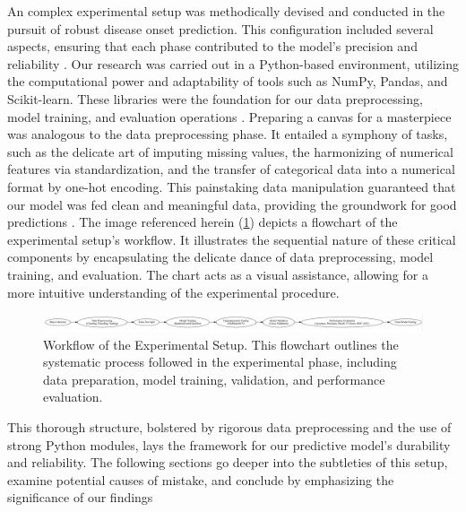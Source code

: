 \documentclass[manuscript,screen,]{acmart}
\begin{document}
An complex experimental setup was methodically devised and conducted in the pursuit of robust disease onset prediction. This configuration included several aspects, ensuring that each phase contributed to the model's precision and reliability \cite{Sturzenegger2012SemiAutomatedMM}.
Our research was carried out in a Python-based environment, utilizing the computational power and adaptability of tools such as NumPy, Pandas, and Scikit-learn. These libraries were the foundation for our data preprocessing, model training, and evaluation operations \cite{Castro2023LandscapeHP}.
Preparing a canvas for a masterpiece was analogous to the data preprocessing phase. It entailed a symphony of tasks, such as the delicate art of imputing missing values, the harmonizing of numerical features via standardization, and the transfer of categorical data into a numerical format by one-hot encoding. This painstaking data manipulation guaranteed that our model was fed clean and meaningful data, providing the groundwork for good predictions \cite{Alexandropoulos2019DataPreprocessing}.
The image referenced herein (\ref{fig: Experimental Setup Workflow}) depicts a flowchart of the experimental setup's workflow. It illustrates the sequential nature of these critical components by encapsulating the delicate dance of data preprocessing, model training, and evaluation. The chart acts as a visual assistance, allowing for a more intuitive understanding of the experimental procedure.

\begin{figure}
    \centering
    \includegraphics[width=1\linewidth]{Images//Sections/Experimental Setup Workflow.png}
    \caption{Workflow of the Experimental Setup. This flowchart outlines the systematic process followed in the experimental phase, including data preparation, model training, validation, and performance evaluation.}
    \label{fig: Experimental Setup Workflow}
\end{figure}

This thorough structure, bolstered by rigorous data preprocessing and the use of strong Python modules, lays the framework for our predictive model's durability and reliability. The following sections go deeper into the subtleties of this setup, examine potential causes of mistake, and conclude by emphasizing the significance of our findings
\end{document}
